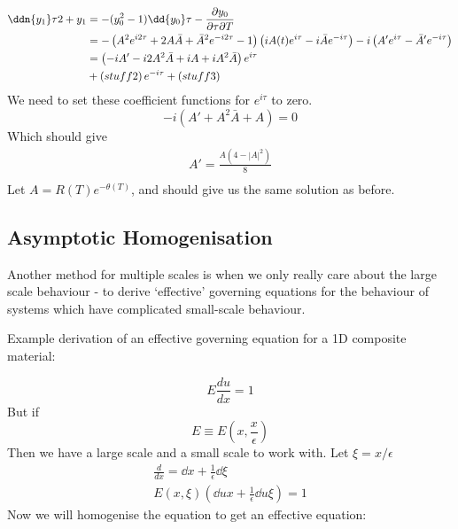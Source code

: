 \documentclass{/home/janmebows/Documents/LatexTemplates/myassignment}
\begin{document}
\begin{align*}
  \ddn{y_1}\tau 2 + y_1 &= -(y_0^2 - 1)\dd{y_0}\tau - \frac{\partial y_{0}}{\partial \tau \partial T}\\
  &=-\left(A^2 e^{i2 \tau} +2A\bar{A} +\bar{A}^2e^{-i2\tau} -1\right) \left(iA(t)e^{i \tau} - i\bar{A}e^{-i\tau}\right) - i\left(A' e^{i\tau} - \bar{A}' e^{-i\tau}\right)\\
  &=\left(-iA'-i2A^2\bar{A} + iA + iA^2 \bar{A}\right) e^{i\tau}\\
  &+ \left(stuff2\right) e^{-i\tau} + \left(stuff3\right)\\
\end{align*}
We need to set these coefficient functions for $e^{i\tau}$ to zero.
\[-i\left(A' + A^2\bar{A} + A \right) =0 \]
Which should give
\begin{align*}
    A' = \frac{A(4-|A|^2)}{8}\\
\end{align*}
Let $A = R(T)e^{-\theta(T)}$, and should give us the same solution as before.


\subsection{Asymptotic Homogenisation}
Another method for multiple scales is when we only really care about the large scale behaviour - to derive `effective' governing equations for the behaviour of systems which have complicated small-scale behaviour.

Example derivation of an effective governing equation for a 1D composite material:

\[E \frac{du}{dx} = 1\]
But if 
\[E\equiv E(x,\frac{x}{\epsilon})\]
Then we have a large scale and a small scale to work with.
Let $\xi = x/\epsilon$
\begin{align*}
    \frac{d}{dx} = \dd{}x + \frac{1}{\epsilon} \dd{}\xi\\
    E(x,\xi) \left(\dd ux + \frac1{\epsilon} \dd u\xi\right) = 1
\end{align*}
Now we will homogenise the equation to get an effective equation:
\end{document}
